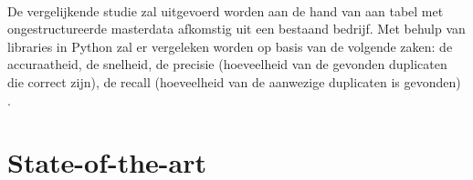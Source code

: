 \\\indent
De vergelijkende studie zal uitgevoerd worden aan de hand van aan tabel met ongestructureerde masterdata afkomstig uit een bestaand bedrijf. Met behulp van libraries in Python zal er vergeleken worden op basis van de volgende zaken: de accuraatheid, de snelheid, de precisie (hoeveelheid van de gevonden duplicaten die correct zijn), de recall (hoeveelheid van de aanwezige duplicaten is gevonden) \autocite{GoogleDevelopers2022}.
%

\section{State-of-the-art}%
\label{sec:state-of-the-art}

